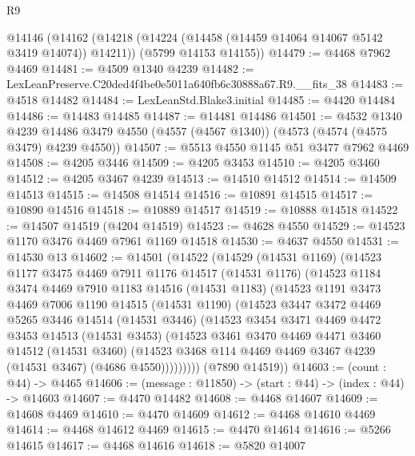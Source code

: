 \begin{lexlean}{R9}
\begin{coremodule}
  @14146
    (@14162
      (@14218 (@14224 (@14458 (@14459 @14064 @14067 @5142 @3419 @14074)) @14211))
      (@5799 @14153 @14155))
@14479 := @4468 @7962 @4469
@14481 := @4509 @1340 @4239
@14482 := LexLeanPreserve.C20ded4f4be0e5011a640fb6c30888a67.R9.__fits_38
@14483 := @4518 @14482
@14484 := LexLeanStd.Blake3.initial
@14485 := @4420 @14484
@14486 := @14483 @14485
@14487 := @14481 @14486
@14501 := @4532
    @1340
    @4239
    @14486
    @3479
    @4550
    (@4557 (@4567 @1340))
    (@4573 (@4574 (@4575 @3479) @4239 @4550))
@14507 := @5513 @4550 @1145 @51 @3477 @7962 @4469
@14508 := @4205 @3446
@14509 := @4205 @3453
@14510 := @4205 @3460
@14512 := @4205 @3467 @4239
@14513 := @14510 @14512
@14514 := @14509 @14513
@14515 := @14508 @14514
@14516 := @10891 @14515
@14517 := @10890 @14516
@14518 := @10889 @14517
@14519 := @10888 @14518
@14522 := @14507 @14519 (@4204 @14519)
@14523 := @4628 @4550
@14529 := @14523 @1170 @3476 @4469 @7961 @1169 @14518
@14530 := @4637 @4550
@14531 := @14530 @13
@14602 := @14501
    (@14522
      (@14529
        (@14531 @1169)
        (@14523
          @1177
          @3475
          @4469
          @7911
          @1176
          @14517
          (@14531 @1176)
          (@14523
            @1184
            @3474
            @4469
            @7910
            @1183
            @14516
            (@14531 @1183)
            (@14523
              @1191
              @3473
              @4469
              @7006
              @1190
              @14515
              (@14531 @1190)
              (@14523
                @3447
                @3472
                @4469
                @5265
                @3446
                @14514
                (@14531 @3446)
                (@14523
                  @3454
                  @3471
                  @4469
                  @4472
                  @3453
                  @14513
                  (@14531 @3453)
                  (@14523
                    @3461
                    @3470
                    @4469
                    @4471
                    @3460
                    @14512
                    (@14531 @3460)
                    (@14523 @3468 @114 @4469 @4469 @3467 @4239 (@14531 @3467) (@4686 @4550)))))))))
      (@7890 @14519))
@14603 := (count : @44) -> @4465
@14606 := (message : @11850) -> (start : @44) -> (index : @44) -> @14603
@14607 := @4470 @14482
@14608 := @4468 @14607
@14609 := @14608 @4469
@14610 := @4470 @14609
@14612 := @4468 @14610 @4469
@14614 := @4468 @14612 @4469
@14615 := @4470 @14614
@14616 := @5266 @14615
@14617 := @4468 @14616
@14618 := @5820 @14007

\end{coremodule}
\end{lexlean}

